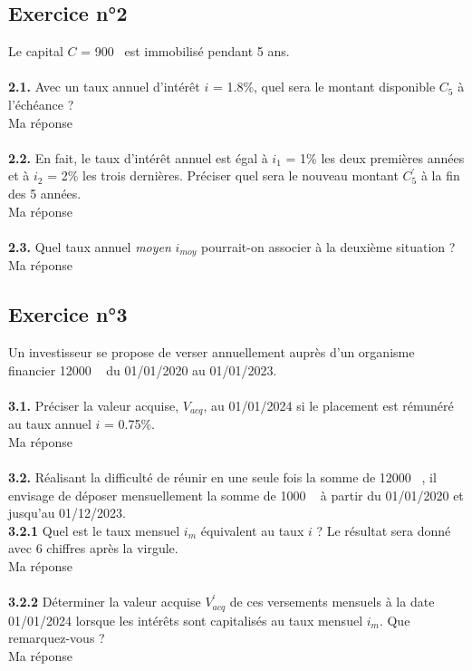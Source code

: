 \documentclass{article}
\begin{document}
\subsection{Exercice n°2}
\textcolor{exogris}{
Le capital $C$ = 900 \texteuro est immobilisé pendant 5 ans.
}
\\\\ \textcolor{exogris}{\textbf{2.1.}
Avec un taux annuel d’intérêt $i$ = 1.8\%, quel sera le montant disponible $C_5$ à l’échéance ?
}
\\%
Ma réponse
\\%
\\%
\textcolor{exogris}{\textbf{2.2.}
En fait, le taux d’intérêt annuel est égal à $i_1$ = 1\% les deux premières années et à $i_2$ = 2\% les trois dernières. Préciser quel sera le nouveau montant $C^{'}_5$ à la fin des 5 années.
}
\\%
Ma réponse
\\%
\\%
\textcolor{exogris}{\textbf{2.3.}
Quel taux annuel \textit{moyen} $i_{moy}$ pourrait-on associer à la deuxième situation ?
}%
\\%
Ma réponse


\subsection{Exercice n°3}
\textcolor{exogris}{
Un investisseur se propose de verser annuellement auprès d’un organisme financier 12000 \texteuro  du 01/01/2020 au 01/01/2023.
}
\\\\ \textcolor{exogris}{\textbf{3.1.}
Préciser la valeur acquise, $V_{acq}$, au 01/01/2024 si le placement est rémunéré au taux annuel $i$ = 0.75\%.
}
\\%
Ma réponse
\\%
\\%
\textcolor{exogris}{\textbf{3.2.}
Réalisant la difficulté de réunir en une seule fois la somme de 12000 \texteuro , il envisage de déposer mensuellement la somme de 1000 \texteuro  à partir du 01/01/2020 et jusqu’au 01/12/2023.
}
\\%
\textcolor{exogris}{\textbf{3.2.1}
Quel est le taux mensuel $i_m$ équivalent au taux $i$ ? Le résultat sera donné avec 6 chiffres après la virgule.
}%
\\%
Ma réponse
\\%
\\%
\textcolor{exogris}{\textbf{3.2.2}
Déterminer la valeur acquise $V^{'}_{acq}$ de ces versements mensuels à la date 01/01/2024 lorsque les intérêts sont capitalisés au taux mensuel $i_m$. Que remarquez-vous ?
}%
\\%
Ma réponse
\end{document}
